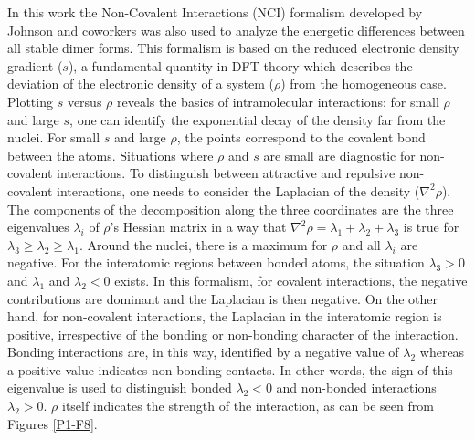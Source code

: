 		In this work the Non-Covalent Interactions (NCI) formalism developed by Johnson and coworkers\cite{johnson2010revealing} was also used to analyze the energetic differences between all stable dimer forms. This formalism is based on the reduced electronic density gradient ($s$), a fundamental quantity in DFT theory which describes the deviation of the electronic density of a system ($\rho$) from the homogeneous case. Plotting $s$ versus $\rho$ reveals the basics of intramolecular interactions: for small $\rho$ and large $s$, one can identify the exponential decay of the density far from the nuclei. For small $s$ and large $\rho$, the points correspond to the covalent bond between the atoms. Situations where $\rho$ and $s$ are small are diagnostic for non-covalent interactions. To distinguish between attractive and repulsive non-covalent interactions, one needs to consider the Laplacian of the density ($\nabla^{2} \rho$).\\
		
		The components of the decomposition along the three coordinates are the three eigenvalues $\lambda_{i}$ of $\rho$'s Hessian matrix in a way that $\nabla^{2} \rho = \lambda_{1} + \lambda_{2} + \lambda_{3}$ is true for $\lambda_{3} \geq \lambda_{2} \geq \lambda_1$. Around the nuclei, there is a maximum for $\rho$ and all $\lambda_i$ are negative. For the interatomic regions between bonded atoms, the situation $\lambda_{3} > 0$ and $\lambda_{1}$ and $\lambda_{2} < 0$ exists. In this formalism, for covalent interactions, the negative contributions are dominant and the Laplacian is then negative. On the other hand, for non-covalent interactions, the Laplacian in the interatomic region is positive, irrespective of the bonding or non-bonding character of the interaction. Bonding interactions are, in this way, identified by a negative value of $\lambda_{2}$ whereas a positive value indicates non-bonding contacts. In other words, the sign of this eigenvalue is used to distinguish bonded $\lambda_{2} < 0$ and non-bonded interactions $\lambda_{2} > 0$.  $\rho$ itself indicates the strength of the interaction, as can be seen from Figures \ref{P1-F8}.\\
		
